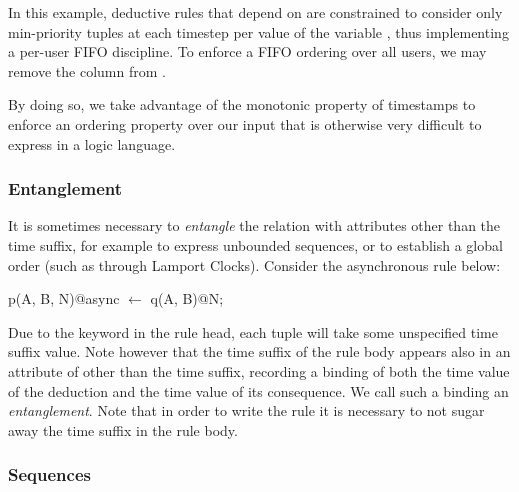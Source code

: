 In this example, deductive rules that depend on 
are constrained to consider only min-priority tuples at each timestep per value
of the variable , thus implementing a per-user FIFO discipline.  To
enforce a FIFO ordering over all users, we may remove the  column
from .


By doing so, we take advantage of the monotonic property of timestamps to enforce an ordering property over our input that is otherwise 
very difficult to express in a logic language.


\subsubsection{Entanglement}
\label{sec:entangle}

It is sometimes necessary to {\em entangle} the  relation
with attributes other than the time suffix, for example to express unbounded
sequences, or to establish a global order (such as through Lamport Clocks).
Consider the asynchronous rule below:

\begin{Dedalus}
p(A, B, N)@async \(\leftarrow\)
  q(A, B)@N;
\end{Dedalus}
\noindent

Due to the  keyword in the rule head, each  tuple
will take some unspecified time suffix value.  Note however that the time
suffix  of the rule body appears also in an attribute of 
other than the time suffix, recording a binding of both the time value of the
deduction and the time value of its consequence.  We call such a binding an
{\em entanglement}.   Note that in order to write the rule it is necessary to
not sugar away the time suffix in the rule body.  

\subsubsection{Sequences}


